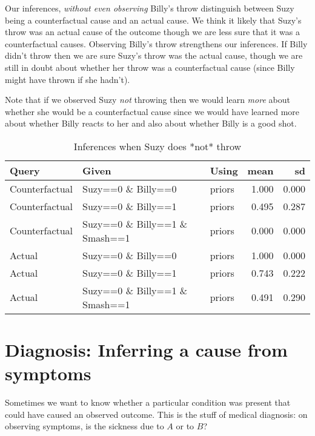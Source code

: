 \documentclass[
  12pt,
]{book}
\begin{document}
Our inferences, \emph{without even observing} Billy's throw distinguish between Suzy being a counterfactual cause and an actual cause. We think it likely that Suzy's throw was an actual cause of the outcome though we are less sure that it was a counterfactual causes. Observing Billy's throw strengthens our inferences. If Billy didn't throw then we are sure Suzy's throw was the actual cause, though we are still in doubt about whether her throw was a counterfactual cause (since Billy might have thrown if she hadn't).

Note that if we observed Suzy \emph{not} throwing then we would learn \emph{more} about whether she would be a counterfactual cause since we would have learned more about whether Billy reacts to her and also about whether Billy is a good shot.

\begin{table}

\caption{\label{tab:appbillysuzy3}Inferences when Suzy does *not* throw}
\centering
\begin{tabular}[t]{l|l|l|r|r}
\hline
Query & Given & Using & mean & sd\\
\hline
Counterfactual & Suzy==0 \& Billy==0 & priors & 1.000 & 0.000\\
\hline
Counterfactual & Suzy==0 \& Billy==1 & priors & 0.495 & 0.287\\
\hline
Counterfactual & Suzy==0 \& Billy==1 \& Smash==1 & priors & 0.000 & 0.000\\
\hline
Actual & Suzy==0 \& Billy==0 & priors & 1.000 & 0.000\\
\hline
Actual & Suzy==0 \& Billy==1 & priors & 0.743 & 0.222\\
\hline
Actual & Suzy==0 \& Billy==1 \& Smash==1 & priors & 0.491 & 0.290\\
\hline
\end{tabular}
\end{table}

\hypertarget{diagnosis-inferring-a-cause-from-symptoms}{%
\section{Diagnosis: Inferring a cause from symptoms}\label{diagnosis-inferring-a-cause-from-symptoms}}

Sometimes we want to know whether a particular condition was present that could have caused an observed outcome. This is the stuff of medical diagnosis: on observing symptoms, is the sickness due to \(A\) or to \(B\)?
\end{document}
